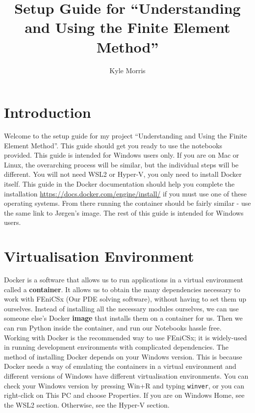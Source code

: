 \documentclass[11pt]{article}
\title{Setup Guide for ``Understanding and Using the Finite Element Method''}
\author{Kyle Morris}
\def\code#1{\texttt{#1}}
\begin{document}
\maketitle

\pagebreak

\section{Introduction}
Welcome to the setup guide for my project ``Understanding and Using the Finite Element Method''. This guide should get you ready to use the notebooks provided. This guide is intended for Windows users only. If you are on Mac or Linux, the overarching process will be similar, but the individual steps will be different. You will not need WSL2 or Hyper-V, you only need to install Docker itself. This guide in the Docker documentation should help you complete the installation \url{https://docs.docker.com/engine/install/} if you must use one of these operating systems. From there running the container should be fairly similar - use the same link to Jørgen's image. The rest of this guide is intended for Windows users.

\section{Virtualisation Environment}
\label{virtualisation}
Docker is a software that allows us to run applications in a virtual environment called a \textbf{container}. It allows us to obtain the many dependencies necessary to work with FEniCSx (Our PDE solving software), without having to set them up ourselves. Instead of installing all the necessary modules ourselves, we can use someone else's Docker \textbf{image} that installs them on a container for us. Then we can run Python inside the container, and run our Notebooks hassle free. \\
Working with Docker is the recommended way to use FEniCSx; it is widely-used in running development environments with complicated dependencies.  The method of installing Docker depends on your Windows version. This is because Docker needs a way of emulating the containers in a virtual environment and different versions of Windows have different virtualisation environments. You can check your Windows version by pressing Win+R and typing \code{winver}, or you can right-click on This PC and choose Properties. If you are on Windows Home, see the WSL2 section. Otherwise, see the Hyper-V section.

\pagebreak
\end{document}
